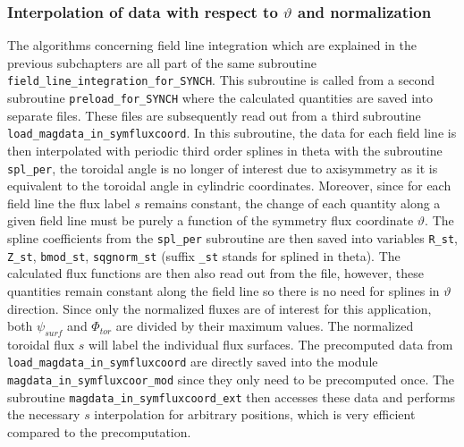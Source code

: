 \documentclass[./main.tex]{subfiles}
\begin{document}
\subsubsection{Interpolation of data with respect to $\vartheta$ and normalization}
The algorithms concerning field line integration which are explained in the previous subchapters are all part of the same subroutine \texttt{field\_line\_integration\_for\_SYNCH}. This subroutine is called from a second subroutine \texttt{preload\_for\_SYNCH} where the calculated quantities are saved into separate files. These files are subsequently read out from a third subroutine \texttt{load\_magdata\_in\_symfluxcoord}. In this subroutine, the data for each field line is then interpolated with periodic third order splines in theta with the subroutine \texttt{spl\_per}, the toroidal angle is no longer of interest due to axisymmetry as it is equivalent to the toroidal angle in cylindric coordinates. Moreover, since for each field line the flux label $s$ remains constant, the change of each quantity along a given field line must be purely a function of the symmetry flux coordinate $\vartheta$. The spline coefficients from the \texttt{spl\_per} subroutine are then saved into variables \texttt{R\_st}, \texttt{Z\_st}, \texttt{bmod\_st}, \texttt{sqgnorm\_st} (suffix \texttt{\_st} stands for splined in theta). The calculated flux functions are then also read out from the file, however, these quantities remain constant along the field line so there is no need for splines in $\vartheta$ direction. Since only the normalized fluxes are of interest for this application, both $\psi_{surf}$ and $\Phi_{tor}$ are divided by their maximum values. The normalized toroidal flux $s$ will label the individual flux surfaces. 
The precomputed data from \texttt{load\_magdata\_in\_symfluxcoord} are directly saved into the module \texttt{magdata\_in\_symfluxcoor\_mod} since they only need to be precomputed once. The subroutine \texttt{magdata\_in\_symfluxcoord\_ext} then accesses these data and performs the necessary $s$ interpolation for arbitrary positions, which is very efficient compared to the precomputation. 
\end{document}
